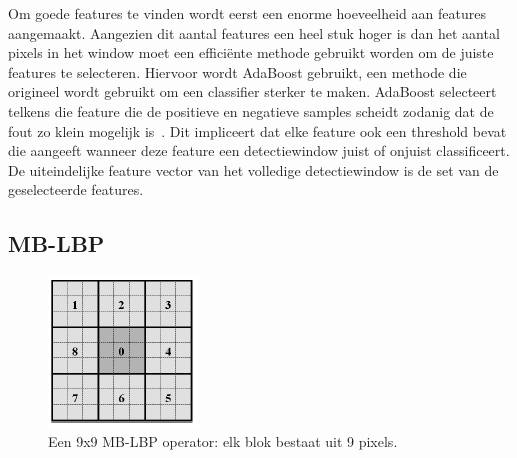 Om goede features te vinden wordt eerst een enorme hoeveelheid aan features aangemaakt. Aangezien dit aantal features een heel stuk hoger is dan het aantal pixels in het window moet een effici\"ente methode gebruikt worden om de juiste features te selecteren. Hiervoor wordt AdaBoost gebruikt, een methode die origineel wordt gebruikt om een classifier sterker te maken. AdaBoost selecteert telkens die feature die de positieve en negatieve samples scheidt zodanig dat de fout zo klein mogelijk is~\cite{viola2001rapid}. Dit impliceert dat elke feature ook een threshold bevat die aangeeft wanneer deze feature een detectiewindow juist of onjuist classificeert. De uiteindelijke feature vector van het volledige detectiewindow is de set van de geselecteerde features.

%

\subsection{MB-LBP} \label{sec:feat_mblbp}

\begin{figure}
  \centering
  \includegraphics[width=.3\linewidth]{img/lbp}
  \caption{Een 9x9 MB-LBP operator: elk blok bestaat uit 9 pixels.}
  \label{fig:lbp}
\end{figure}

